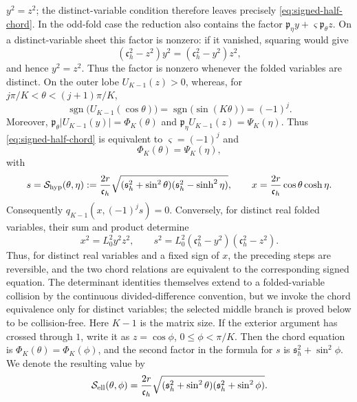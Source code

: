 \documentclass[a4paper,preprint,12pt,nopreprintline,sort&compress]{elsarticle}
\numberwithin{equation}{section}
\theoremstyle{remark}
\begin{document}
\(y^2=z^2\); the distinct-variable condition therefore leaves precisely
\eqref{eq:signed-half-chord}.  In the odd-fold case the reduction also
contains the factor
\(\mathfrak p_\eta y+\varsigma\mathfrak p_\theta z\).  On a
distinct-variable sheet this factor is nonzero: if it vanished, squaring
would give
\[
 (\mathfrak c_h^2-z^2)y^2=(\mathfrak c_h^2-y^2)z^2,
\]
and hence \(y^2=z^2\).  Thus the factor is nonzero whenever the folded
variables are distinct.  On the outer lobe
\(U_{K-1}(z)>0\), whereas, for
\(j\pi/K<\theta<(j+1)\pi/K\),
\[
 \operatorname{sgn}\bigl(U_{K-1}(\cos\theta)\bigr)
 =\operatorname{sgn}\bigl(\sin(K\theta)\bigr)=(-1)^j.
\]
Moreover,
\(\mathfrak p_\theta|U_{K-1}(y)|=\Phi_K(\theta)\) and
\(\mathfrak p_\eta U_{K-1}(z)=\Psi_K(\eta)\).  Thus
\eqref{eq:signed-half-chord} is equivalent to
\(\varsigma=(-1)^j\) and
\begin{equation}\label{eq:chord-equation}
 \Phi_K(\theta)=\Psi_K(\eta),
\end{equation}
with
\begin{equation}\label{eq:channel-xs}
 s=\mathcal S_{\rm hyp}(\theta,\eta)
 :=\frac{2r}{\mathfrak c_h}
 \sqrt{(\mathfrak s_h^2+\sin^2\theta)
       (\mathfrak s_h^2-\sinh^2\eta)},\qquad
 x=\frac{2r}{\mathfrak c_h}\cos\theta\cosh\eta.
\end{equation}
Consequently \(q_{K-1}(x,(-1)^j s)=0\).  Conversely, for distinct real
folded variables, their sum and product determine
\[
 x^2=L_0^2y^2z^2,\qquad
 s^2=L_0^2(\mathfrak c_h^2-y^2)(\mathfrak c_h^2-z^2).
\]
Thus, for distinct real variables and a fixed sign of \(x\), the
preceding steps are reversible, and the two chord relations are
equivalent to the corresponding signed equation.  The determinant
identities themselves extend to a folded-variable collision by the
continuous divided-difference convention, but we invoke the chord
equivalence only for distinct variables; the selected middle branch is
proved below to be collision-free.
Here \(K-1\) is the matrix size.  If the exterior argument has crossed
through \(1\), write it as \(z=\cos\phi\),
\(0\leq\phi<\pi/K\).  Then the chord equation is
\(\Phi_K(\theta)=\Phi_K(\phi)\), and the second factor in the formula
for \(s\) is \(\mathfrak s_h^2+\sin^2\phi\).  We denote the resulting
value by
\[
 \mathcal S_{\rm ell}(\theta,\phi)
 =\frac{2r}{\mathfrak c_h}
 \sqrt{(\mathfrak s_h^2+\sin^2\theta)
       (\mathfrak s_h^2+\sin^2\phi)}.
\]
\end{document}
